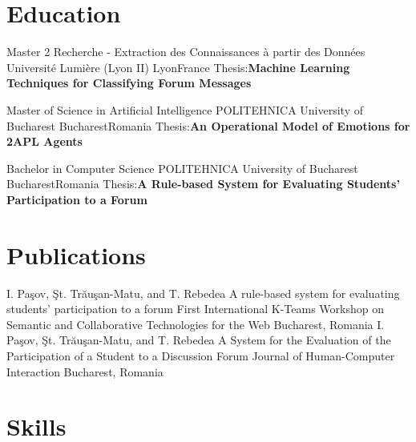 \documentclass[11pt,a4paper,sans]{moderncv}
\begin{document}
\newpage
\section{Education}
{Master 2 Recherche - Extraction des Connaissances \`a partir des Donn\'ees}
{Universit\'e Lumi\`ere (Lyon II)}
{Lyon}{France}
{Thesis:\textbf{Machine Learning Techniques for Classifying Forum Messages}}

{Master of Science in Artificial Intelligence}
{POLITEHNICA University of Bucharest}
{Bucharest}{Romania}
{Thesis:\textbf{An Operational Model of Emotions for 2APL Agents}}

{Bachelor in Computer Science}
{POLITEHNICA University of Bucharest}
{Bucharest}{Romania}
{Thesis:\textbf{A Rule-based System for Evaluating Students' Participation to a Forum}}



\section{Publications}

{I. Pa\c{s}ov, \c{S}t. Tr\u{a}u\c{s}an-Matu, and T. Rebedea}
{A rule-based system for evaluating students' participation to a forum}
{First International K-Teams Workshop on Semantic and Collaborative Technologies for the Web}
{Bucharest, Romania}{}
{I. Pa\c{s}ov, \c{S}t. Tr\u{a}u\c{s}an-Matu, and T. Rebedea}
{A System for the Evaluation of the Participation of a Student to a Discussion Forum}
{Journal of Human-Computer Interaction}
{Bucharest, Romania}{}


\section{Skills}

\end{document}
